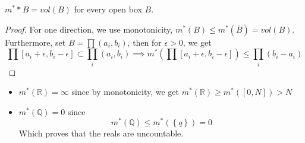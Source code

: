 \documentclass[../main.tex]{subfiles}
\begin{document}
\begin{crly}
$m^{*}*B= vol( B) $ for every open box $B$.
\end{crly}
\begin{proof}
For one direction, we use monotonicity,
$m^{*}( B) \leq m^{*}( \overline{B}) = vol( B) $.\\
Furthermore, set $ B= \prod ( a_i,b_i) $, then for $\epsilon>0$, we get
\[ 
\prod [ a_i+\epsilon,b_i-\epsilon] \subset \prod_i ( a_i,b_i) \implies m^{*}( \prod [ a_i+\epsilon,b_i-\epsilon]  ) \leq \prod_i ( b_i-a_i) 
\]

\end{proof}
\begin{exemple}
	\begin{itemize}
	\item 
$m^{*}( \mathbb{R}) = \infty $ since by monotonicity, we get $m^{*}( \mathbb{R}) \geq m^{*}( [ 0,N] ) >N$ 
\item $m^{*}( \mathbb{Q}) =0 $ since
	\[ 
	m^{*}( \mathbb{Q}) \leq m^{*}( \left\{ q \right\} ) =0
	\]
	Which proves that the reals are uncountable.
	\end{itemize}
	
\end{exemple}
\end{document}
